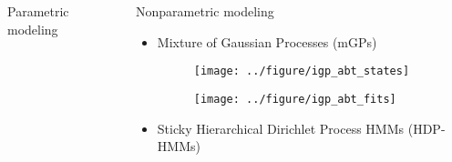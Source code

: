 \documentclass[final, 8pt]{beamer}
\newlength{\onecolwid}
\begin{document}
\begin{frame}
\begin{columns}
\begin{column}{\onecolwid}
\begin{block}{Parametric modeling}
\end{block}

\end{column}
\begin{column}{\onecolwid}

\begin{block}{Nonparametric modeling}
\begin{itemize}
\item Mixture of Gaussian Processes (mGPs)

\begin{figure}[!p]
  \centering
  \texttt{[image: ../figure/igp\_abt\_states]}
  \caption{\label{fig:igp_abt_states}}
\end{figure}

\begin{figure}[!p]
  \centering
  \texttt{[image: ../figure/igp\_abt\_fits]}
  \caption{\label{fig:igp_abt_fits}}
\end{figure}

\item Sticky Hierarchical Dirichlet Process HMMs (HDP-HMMs)
\end{itemize}
\end{block}

 
 
\end{column}
\end{columns}

\end{frame}
\end{document}
